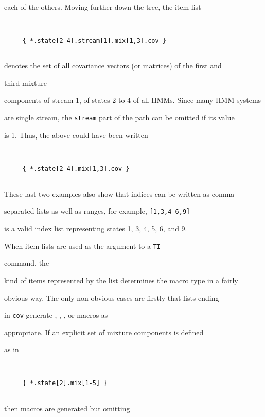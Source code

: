 each of the others.  Moving further down the tree, the item list


\begin{verbatim}


     { *.state[2-4].stream[1].mix[1,3].cov }


\end{verbatim}


denotes the set of all covariance vectors (or matrices) of the first and


third mixture


components of stream 1, of states 2 to 4 of all HMMs.  Since many HMM systems


are single stream, the \texttt{stream} part of the path can be omitted if its value


is 1.  Thus, the above could have been written


\begin{verbatim}


     { *.state[2-4].mix[1,3].cov }


\end{verbatim}


These last two examples also show that indices can be written as comma


separated lists as well as ranges, for example, \texttt{[1,3,4-6,9]}


is a valid index list representing states 1, 3, 4, 5, 6, and 9.





When item lists are used as the argument to a \texttt{TI} 


command, the


kind of items represented by the list determines the macro type in a fairly


obvious way.  The only non-obvious cases are firstly that lists ending


in \texttt{cov} generate , , , or  macros as


appropriate.   If an explicit set of mixture components is defined


as in


\begin{verbatim}


     { *.state[2].mix[1-5] }


\end{verbatim}


then   macros are generated but omitting


